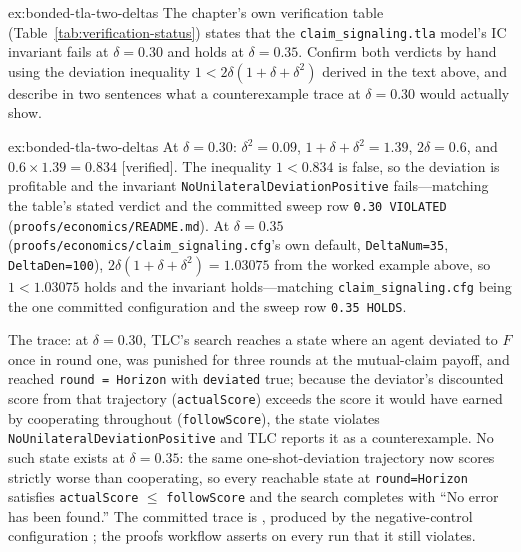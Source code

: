 \documentclass[11pt,a4paper]{article}
\theoremstyle{definition}
\theoremstyle{remark}
\begin{document}
\begin{pdexercise}[kind=Trace,rating=2]{ex:bonded-tla-two-deltas}
The chapter's own verification table (Table~\ref{tab:verification-status}) states that the \texttt{claim\_signaling.tla} model's IC invariant fails at $\delta=0.30$ and holds at $\delta=0.35$. Confirm both verdicts by hand using the deviation inequality $1 < 2\delta(1+\delta+\delta^2)$ derived in the text above, and describe in two sentences what a counterexample trace at $\delta=0.30$ would actually show.
\end{pdexercise}
\begin{pdsolution}{ex:bonded-tla-two-deltas}
At $\delta=0.30$: $\delta^2=0.09$, $1+\delta+\delta^2=1.39$, $2\delta=0.6$, and $0.6\times1.39=0.834$ [verified]. The inequality $1<0.834$ is false, so the deviation is profitable and the invariant \texttt{NoUnilateralDeviationPositive} fails---matching the table's stated verdict and the committed sweep row \texttt{0.30 VIOLATED} (\texttt{proofs/economics/README.md}). At $\delta=0.35$ (\texttt{proofs/economics/claim\_signaling.cfg}'s own default, \texttt{DeltaNum=35}, \texttt{DeltaDen=100}), $2\delta(1+\delta+\delta^2)=1.03075$ from the worked example above, so $1<1.03075$ holds and the invariant holds---matching \texttt{claim\_signaling.cfg} being the one committed configuration and the sweep row \texttt{0.35 HOLDS}.

The trace: at $\delta=0.30$, TLC's search reaches a state where an agent deviated to $F$ once in round one, was punished for three rounds at the mutual-claim payoff, and reached \texttt{round = Horizon} with \texttt{deviated} true; because the deviator's discounted score from that trajectory (\texttt{actualScore}) exceeds the score it would have earned by cooperating throughout (\texttt{followScore}), the state violates \texttt{No}\allowbreak\texttt{Unilateral}\allowbreak\texttt{Deviation}\allowbreak\texttt{Positive} and TLC reports it as a counterexample. No such state exists at $\delta=0.35$: the same one-shot-deviation trajectory now scores strictly worse than cooperating, so every reachable state at \texttt{round=Horizon} satisfies \texttt{actualScore} $\le$ \texttt{followScore} and the search completes with ``No error has been found.'' The committed trace is , produced by the negative-control configuration ; the proofs workflow asserts on every run that it still violates.
\end{pdsolution}
\end{document}
